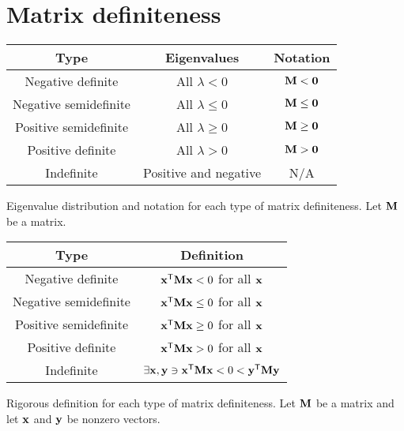 \section{Matrix definiteness}
\begin{booktable}
  \begin{tabular}{|ccc|}
    \hline
    \rowcolor{headingbg}
    \textbf{Type} & \textbf{Eigenvalues} & \textbf{Notation} \\
    \hline
    Negative definite &
      All $\lambda < 0$ &
      $\mathbf{M} < \mathbf{0}$ \\
    Negative semidefinite &
      All $\lambda \leq 0$ &
      $\mathbf{M} \leq \mathbf{0}$ \\
    Positive semidefinite &
      All $\lambda \geq 0$ &
      $\mathbf{M} \geq \mathbf{0}$ \\
    Positive definite &
      All $\lambda > 0$ &
      $\mathbf{M} > \mathbf{0}$ \\
    Indefinite &
      Positive and negative &
      N/A \\
    \hline
  \end{tabular}
  \caption{Eigenvalue distribution and notation for each type of matrix
    definiteness. Let $\mathbf{M}$ be a matrix.}
\end{booktable}
\begin{booktable}
  \begin{tabular}{|cc|}
    \hline
    \rowcolor{headingbg}
    \textbf{Type} & \textbf{Definition} \\
    \hline
    Negative definite &
      $\mathbf{x}^\mathsf{T}\mathbf{M}\mathbf{x} < 0$ for all $\mathbf{x}$ \\
    Negative semidefinite &
      $\mathbf{x}^\mathsf{T}\mathbf{M}\mathbf{x} \leq 0$ for all $\mathbf{x}$ \\
    Positive semidefinite &
      $\mathbf{x}^\mathsf{T}\mathbf{M}\mathbf{x} \geq 0$ for all $\mathbf{x}$ \\
    Positive definite &
      $\mathbf{x}^\mathsf{T}\mathbf{M}\mathbf{x} > 0$ for all $\mathbf{x}$ \\
    Indefinite &
      $\exists \mathbf{x}, \mathbf{y} \ni \mathbf{x}^\mathsf{T}\mathbf{M}\mathbf{x} < 0 < \mathbf{y}^\mathsf{T}\mathbf{M}\mathbf{y}$ \\
    \hline
  \end{tabular}
  \caption{Rigorous definition for each type of matrix definiteness. Let
    $\mathbf{M}$ be a matrix and let $\mathbf{x}$ and $\mathbf{y}$ be nonzero vectors.}
\end{booktable}
